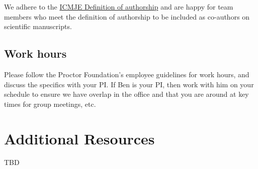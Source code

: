 \documentclass[]{book}
\begin{document}
We adhere to the \href{http://www.icmje.org/recommendations/browse/roles-and-responsibilities/defining-the-role-of-authors-and-contributors.html}{ICMJE Definition of authorship} and are happy for team members who meet the definition of authorship to be included as co-authors on scientific manuscripts.

\hypertarget{work-hours}{%
\section{Work hours}\label{work-hours}}

Please follow the Proctor Foundation's employee guidelines for work hours, and discuss the specifics with your PI. If Ben is your PI, then work with him on your schedule to ensure we have overlap in the office and that you are around at key times for group meetings, etc.

\hypertarget{resources}{%
\chapter{Additional Resources}\label{resources}}

TBD


\end{document}
